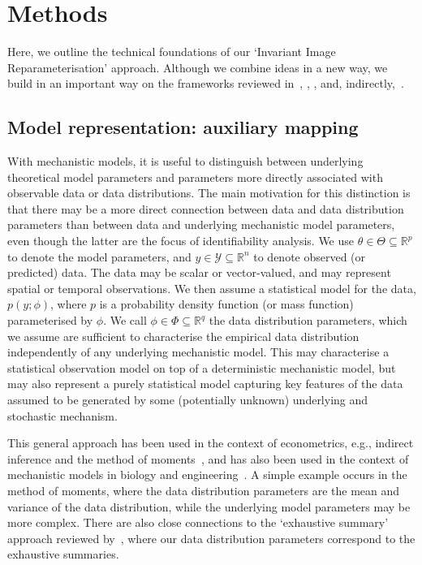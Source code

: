 \section{Methods}
Here, we outline the technical foundations of our `Invariant Image Reparameterisation' approach. Although we combine ideas in a new way, we build in an important way on the frameworks reviewed in~\cite{Cole2010}, \cite{Cole2020}, \cite{Simpson2023}, and, indirectly,~\cite{Maclaren2019, Maclaren2021}.

\subsection{Model representation: auxiliary mapping}
With mechanistic models, it is useful to distinguish between underlying theoretical model parameters and parameters more directly associated with observable data or data distributions. The main motivation for this distinction is that there may be a more direct connection between data and data distribution parameters than between data and underlying mechanistic model parameters, even though the latter are the focus of identifiability analysis. We use $\theta \in \Theta \subseteq \mathbb{R}^p$ to denote the model parameters, and $y \in \mathcal{Y} \subseteq \mathbb{R}^n$ to denote observed (or predicted) data. The data may be scalar or vector-valued, and may represent spatial or temporal observations. We then assume a statistical model for the data, $p(y;\phi)$, where $p$ is a probability density function (or mass function) parameterised by $\phi$. We call $\phi \in \Phi \subseteq \mathbb{R}^q$ the data distribution parameters, which we assume are sufficient to characterise the empirical data distribution independently of any underlying mechanistic model. This may characterise a statistical observation model on top of a deterministic mechanistic model, but may also represent a purely statistical model capturing key features of the data assumed to be generated by some (potentially unknown) underlying and stochastic mechanism.

This general approach has been used in the context of econometrics, e.g., indirect inference and the method of moments~\cite{Gourieroux1993, Heggland2004}, and has also been used in the context of mechanistic models in biology and engineering~\cite{Drovandi2015, Browning2020, Simpson2021, Simpson2023}. A simple example occurs in the method of moments, where the data distribution parameters are the mean and variance of the data distribution, while the underlying model parameters may be more complex. There are also close connections to the `exhaustive summary' approach reviewed by~\cite{Cole2010, Cole2020}, where our data distribution parameters correspond to the exhaustive summaries.

